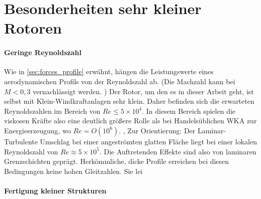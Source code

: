 \section{Besonderheiten sehr kleiner Rotoren}
\label{sec:low_re}
\paragraph{Geringe Reynoldszahl}
Wie in \ref{sec:forces_profile} erwähnt, hängen die Leistungswerte eines aerodynamischen Profils von der Reynoldszahl ab. (Die Machzahl kann bei \( M<0,3\) vernachlässigt werden. \cite{anderson_fundamentals_2017}) Der Rotor, um den es in dieser Arbeit geht, ist selbst mit Klein-Windkraftanlagen sehr klein. Daher befinden sich die erwarteten Reynoldszahlen im Bereich von \(Re\leq 5 \times 10^4\). In diesem Bereich spielen die viskosen Kräfte also eine deutlich größere Rolle als bei Handelsüblichen WKA zur Energieerzeugung, wo  \(Re = O(10^6)\). \cite{hau_physikalische_2016}, \cite{anderson_fundamentals_2017} Zur Orientierung: Der Laminar-Turbulente Umschlag bei einer angeströmten glatten Fläche liegt bei einer lokalen Reynoldszahl von \(Re\approx 5 \times 10^5\). 
Die Auftretenden Effekte sind also von laminaren Grenzschichten geprägt. Herkömmliche, dicke Profile erreichen bei diesen Bedingungen keine hohen Gleitzahlen. Sie lei

\paragraph{Fertigung kleiner Strukturen}